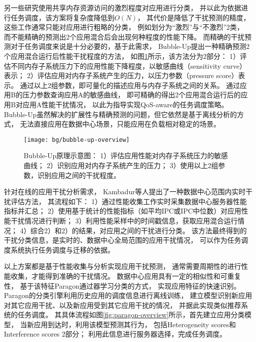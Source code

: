 另一些研究使用共享内存资源访问的激烈程度对应用进行分类，
并以此为依据进行任务调度\cite{Chandra:2005, Knauerhase:2008, mars_contention_2010,
Zhuravlev:2010}，该方案将复杂度降低到$O(N)$，
其代价是降低了干扰预测的精度，这些工作通常只能对应用进行粗略的分类，
例如划分为``激烈''与``不激烈''2类，
而不能精确的预测出2个应用混合后会出现何种程度的性能下降。
而精确的干扰预测对于任务调度来说是十分必要的，基于此需求，
Bubble-Up\cite{mars_bubble-up:_2011}提出一种精确预测2个应用混合运行后性能干扰程度的方法，
如图\ref{fig:bubble-up-overview}所示，该方法分为2部分：
1）评估不同内存子系统压力下的应用性能下降程度，以敏感曲线（sensitivity curve）表示；
2）评估应用对内存子系统产生的压力，以压力参数（pressure score）表示。
通过以上2组参数，即可量化的描述应用与内存子系统之间的关系。
通过应用B的压力参数查询应用A的敏感曲线，
即可精确的得出2个应用混合运行后的应用B对应用A性能干扰情况，
以此为指导实现QoS-aware的任务调度策略。
Bubble-Up虽然解决的扩展性与精确预测的问题，但它依然是基于离线分析的方式，
无法直接应用在数据中心场景，只能应用在负载相对稳定的场景。

\begin{figure}[tb]
  \centering
  \texttt{[image: bg/bubble-up-overview]}
  \caption[BubbleUp原理示意图\cite{mars_bubble-up:_2011}]{
    Bubble-Up\cite{mars_bubble-up:_2011}原理示意图：
    1）评估应用性能对内存子系统压力的敏感曲线；
    2）识别应用对内存子系统产生的压力；
    3）使用以上2组参数，识别应用之间的干扰程度。}
  \label{fig:bubble-up-overview}
\end{figure}

针对在线的应用干扰分析需求，
Kambadur等人提出了一种数据中心范围内实时干扰评估方法\cite{kambadur_measuring_2012}，
其流程如下：
1）通过性能收集工作实时采集数据中心服务器性能指标并汇总；
2）使用基于统计的性能指标（如平均IPC或IPC中位数）对应用性能干扰情况进行判断；
3）利用性能采样中的时间戳信息，获取应用混合运行情况；
4）综合2）和2）的结果，对应用之间的干扰进行分类。
该方法最终得到的干扰分类信息，是实时的、数据中心全局范围的应用干扰情况，
可以作为任务调度系统执行任务调度与迁移的依据。

以上方案都是基于性能收集与分析实现应用干扰预测，
通常需要周期性的进行性能收集，才能得到准确的干扰情况。
数据中心应用具有一定的相似性和可重复性，
基于该特征Paragon\cite{delimitrou_paragon:_2013}通过器学习分类的方式，
实现应用特征的快速识别。
Paragon的分类引擎利用历史应用的调度信息进行离线训练，
建立模型识别新应用对其它应用干扰、以及新应用受到其它应用干扰的情况，
并据此实现类似推荐系统的任务调度。
其具体流程如图\ref{fig:paragon-overview}所示，首先建立应用分类模型，
当新应用到达时，利用该模型预测其行为，
包括Heterogeneity scores和Interference scores 2部分；
利用此信息进行服务器选择，完成任务调度。

